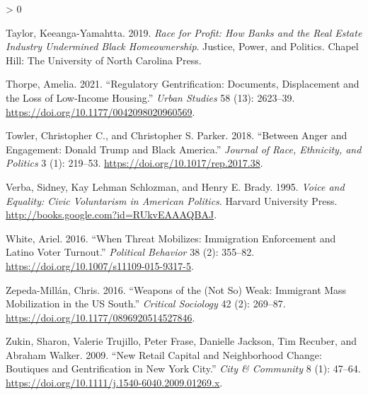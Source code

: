 \documentclass[
  12pt,
]{article}
\newlength{\cslhangindent}
\newenvironment{CSLReferences}[2] %
 {%
  \setlength{\parindent}{0pt}
  \ifodd #1 \everypar{\setlength{\hangindent}{\cslhangindent}}\ignorespaces\fi
  \ifnum #2 > 0
  \setlength{\parskip}{#2\baselineskip}
  \fi
 }%
 {}
\begin{document}
\begin{CSLReferences}{1}{0}
\leavevmode\hypertarget{ref-Taylor2019}{}%
Taylor, Keeanga-Yamahtta. 2019. \emph{Race for Profit: How Banks and the Real Estate Industry Undermined Black Homeownership}. Justice, Power, and Politics. {Chapel Hill}: {The University of North Carolina Press}.

\leavevmode\hypertarget{ref-Thorpe2021}{}%
Thorpe, Amelia. 2021. {``Regulatory Gentrification: {Documents}, Displacement and the Loss of Low-Income Housing.''} \emph{Urban Studies} 58 (13): 2623--39. \url{https://doi.org/10.1177/0042098020960569}.

\leavevmode\hypertarget{ref-Towler2018}{}%
Towler, Christopher C., and Christopher S. Parker. 2018. {``Between {Anger} and {Engagement}: {Donald Trump} and {Black America}.''} \emph{Journal of Race, Ethnicity, and Politics} 3 (1): 219--53. \url{https://doi.org/10.1017/rep.2017.38}.

\leavevmode\hypertarget{ref-Verba1995}{}%
Verba, Sidney, Kay Lehman Schlozman, and Henry E. Brady. 1995. \emph{Voice and {Equality}: {Civic Voluntarism} in {American Politics}}. {Harvard University Press}. \url{http://books.google.com?id=RUkvEAAAQBAJ}.

\leavevmode\hypertarget{ref-White2016}{}%
White, Ariel. 2016. {``When {Threat Mobilizes}: {Immigration Enforcement} and {Latino Voter Turnout}.''} \emph{Political Behavior} 38 (2): 355--82. \url{https://doi.org/10.1007/s11109-015-9317-5}.

\leavevmode\hypertarget{ref-Zepeda-Millan2016}{}%
Zepeda-Millán, Chris. 2016. {``Weapons of the ({Not So}) {Weak}: {Immigrant Mass Mobilization} in the {US South}.''} \emph{Critical Sociology} 42 (2): 269--87. \url{https://doi.org/10.1177/0896920514527846}.

\leavevmode\hypertarget{ref-Zukin2009}{}%
Zukin, Sharon, Valerie Trujillo, Peter Frase, Danielle Jackson, Tim Recuber, and Abraham Walker. 2009. {``New {Retail Capital} and {Neighborhood Change}: {Boutiques} and {Gentrification} in {New York City}.''} \emph{City \& Community} 8 (1): 47--64. \url{https://doi.org/10.1111/j.1540-6040.2009.01269.x}.

\end{CSLReferences}
\end{document}
